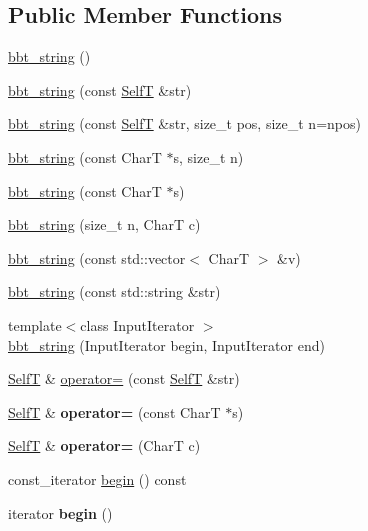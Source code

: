 \subsection*{Public Member Functions}
\begin{CompactItemize}
\item 
\hyperlink{classbbt__string_23ed2b13db62f8dbc5f6ce67a070cb90}{bbt\_\-string} ()
\item 
\hyperlink{classbbt__string_3c06fceec11f85e5b3c8f26c624978d4}{bbt\_\-string} (const \hyperlink{classbbt__string}{SelfT} \&str)
\item 
\hyperlink{classbbt__string_77ec72da53ea945e7ede3056319ce609}{bbt\_\-string} (const \hyperlink{classbbt__string}{SelfT} \&str, size\_\-t pos, size\_\-t n=npos)
\item 
\hyperlink{classbbt__string_d759c3a610215f7c52ac7a4c9e13aaab}{bbt\_\-string} (const CharT $\ast$s, size\_\-t n)
\item 
\hyperlink{classbbt__string_ace6416bbc018cb5fd7e0ebd836d929d}{bbt\_\-string} (const CharT $\ast$s)
\item 
\hyperlink{classbbt__string_bd88607f68eba44af1456842d08fb72b}{bbt\_\-string} (size\_\-t n, CharT c)
\item 
\hyperlink{classbbt__string_86c2a8194f3ec4902b3410c806baae4c}{bbt\_\-string} (const std::vector$<$ CharT $>$ \&v)
\item 
\hyperlink{classbbt__string_496d220047c4dab83664794ea1b754d1}{bbt\_\-string} (const std::string \&str)
\item 
{\footnotesize template$<$class InputIterator $>$ }\\\hyperlink{classbbt__string_2e84206283397353a456342f891ef460}{bbt\_\-string} (InputIterator begin, InputIterator end)
\item 
\hyperlink{classbbt__string}{SelfT} \& \hyperlink{classbbt__string_127c0d9e38d27260065d2b8a24cb78c1}{operator=} (const \hyperlink{classbbt__string}{SelfT} \&str)
\item 
\hypertarget{classbbt__string_3c4377b2ae98671a11ad1b236dfbb0d2}{
\hyperlink{classbbt__string}{SelfT} \& \textbf{operator=} (const CharT $\ast$s)}
\label{classbbt__string_3c4377b2ae98671a11ad1b236dfbb0d2}

\item 
\hypertarget{classbbt__string_fa4a9fba615c8f7c76a606f44285730a}{
\hyperlink{classbbt__string}{SelfT} \& \textbf{operator=} (CharT c)}
\label{classbbt__string_fa4a9fba615c8f7c76a606f44285730a}

\item 
const\_\-iterator \hyperlink{classbbt__string_65dc62558aea86248f43967709e4e012}{begin} () const 
\item 
\hypertarget{classbbt__string_44aa1bbc5c8e7af9122220198b239009}{
iterator \textbf{begin} ()}
\label{classbbt__string_44aa1bbc5c8e7af9122220198b239009}


\end{CompactItemize}
